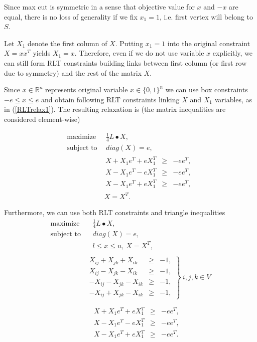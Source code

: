 \documentclass[12pt]{book}
\theoremstyle{definition}
\begin{document}
Since max cut is symmetric in a sense that objective value for $x$ and $-x$ are equal, there is no loss of generality if we fix $x_1 = 1$, i.e. first vertex will belong to $S$. 

Let $X_1$ denote the first column of $X$. Putting $x_1 = 1$ into the original constraint $X = xx^T$ yields $X_1 = x$.
Therefore, even if we do not use variable $x$ explicitly, we can still form RLT constraints building links between first column (or first row due to symmetry) and the rest of the matrix $X$.


Since $x\in \mathbb{R}^n$ represents original variable $x\in \{0,1\}^n$ we can use box constraints 
$-e \leq x \leq e$
and obtain following RLT constraints linking $X$ and $X_1$ variables, as in (\ref{RLTrelax1}).
The resulting relaxation is (the matrix inequalities are considered element-wise)


\begin{equation}
\label{MaxCutLPRelaxRLT}
\begin{array}{ll}
\mbox{maximize} & \ \ \frac{1}{4}L\bullet X, \\
\mbox{subject to} & \ \ diag(X) = e , \\
		& \begin{array}{lcl}
		 X + X_1e^T + eX_1^T & \geq & -ee^T, \\
		 X - X_1e^T - eX_1^T & \geq & -ee^T, \\
		 X - X_1e^T + eX_1^T & \geq & -ee^T,
	\end{array}\\
 		&\  X=X^T.
\end{array}
\end{equation} 

Furthermore, we can use both RLT constraints and triangle inequalities
\begin{equation}
\label{MaxCutLPRelaxRLT+triangle}
\begin{array}{ll}
\mbox{maximize} & \ \ \ \ \frac{1}{4}L\bullet X, \\
\mbox{subject to} & \ \ \ \ diag(X) = e ,\\
& \ \ \ \ l\leq x \leq u,\ X=X^T, \\
& \\
& \left.\begin{array}{rcl}
X_{ij} + X_{jk} + X_{ik} &\geq & -1, \\
X_{ij} - X_{jk} - X_{ik} &\geq & -1, \\
- X_{ij} - X_{jk} - X_{ik} &\geq & -1, \\
- X_{ij} + X_{jk} - X_{ik} &\geq & -1,
\end{array}\right\rbrace \ i,j,k \in V \\
& \\
		& \ \ \ \begin{array}{lcl}
		 X + X_1e^T + eX_1^T & \geq & -ee^T, \\
		 X - X_1e^T - eX_1^T & \geq & -ee^T, \\
		 X - X_1e^T + eX_1^T & \geq & -ee^T.
	\end{array}
\end{array}
\end{equation} 
\end{document}
